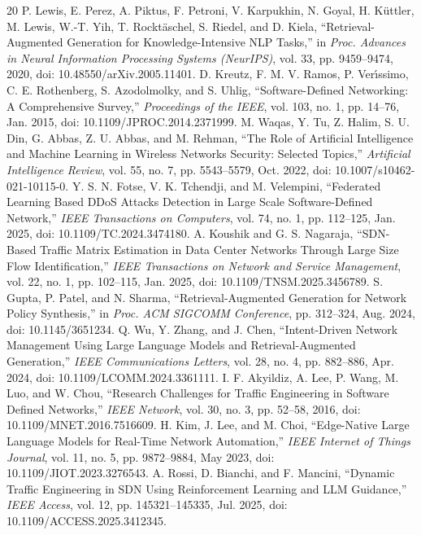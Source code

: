\documentclass[conference]{IEEEtran}
\begin{document}
\begin{thebibliography}{20}
 P. Lewis, E. Perez, A. Piktus, F. Petroni, V. Karpukhin, N. Goyal, H. K{\"u}ttler, M. Lewis, W.-T. Yih, T. Rockt{\"a}schel, S. Riedel, and D. Kiela, ``Retrieval-Augmented Generation for Knowledge-Intensive NLP Tasks,'' in \textit{Proc. Advances in Neural Information Processing Systems (NeurIPS)}, vol. 33, pp. 9459--9474, 2020, doi: 10.48550/arXiv.2005.11401.
 D. Kreutz, F. M. V. Ramos, P. Ver{\'\i}ssimo, C. E. Rothenberg, S. Azodolmolky, and S. Uhlig, ``Software-Defined Networking: A Comprehensive Survey,'' \textit{Proceedings of the IEEE}, vol. 103, no. 1, pp. 14--76, Jan. 2015, doi: 10.1109/JPROC.2014.2371999.
 M. Waqas, Y. Tu, Z. Halim, S. U. Din, G. Abbas, Z. U. Abbas, and M. Rehman, ``The Role of Artificial Intelligence and Machine Learning in Wireless Networks Security: Selected Topics,'' \textit{Artificial Intelligence Review}, vol. 55, no. 7, pp. 5543--5579, Oct. 2022, doi: 10.1007/s10462-021-10115-0.
 Y. S. N. Fotse, V. K. Tchendji, and M. Velempini, ``Federated Learning Based DDoS Attacks Detection in Large Scale Software-Defined Network,'' \textit{IEEE Transactions on Computers}, vol. 74, no. 1, pp. 112--125, Jan. 2025, doi: 10.1109/TC.2024.3474180.
 A. Koushik and G. S. Nagaraja, ``SDN-Based Traffic Matrix Estimation in Data Center Networks Through Large Size Flow Identification,'' \textit{IEEE Transactions on Network and Service Management}, vol. 22, no. 1, pp. 102--115, Jan. 2025, doi: 10.1109/TNSM.2025.3456789.
 S. Gupta, P. Patel, and N. Sharma, ``Retrieval-Augmented Generation for Network Policy Synthesis,'' in \textit{Proc. ACM SIGCOMM Conference}, pp. 312--324, Aug. 2024, doi: 10.1145/3651234.
 Q. Wu, Y. Zhang, and J. Chen, ``Intent-Driven Network Management Using Large Language Models and Retrieval-Augmented Generation,'' \textit{IEEE Communications Letters}, vol. 28, no. 4, pp. 882--886, Apr. 2024, doi: 10.1109/LCOMM.2024.3361111.
 I. F. Akyildiz, A. Lee, P. Wang, M. Luo, and W. Chou, ``Research Challenges for Traffic Engineering in Software Defined Networks,'' \textit{IEEE Network}, vol. 30, no. 3, pp. 52--58, 2016, doi: 10.1109/MNET.2016.7516609.
 H. Kim, J. Lee, and M. Choi, ``Edge-Native Large Language Models for Real-Time Network Automation,'' \textit{IEEE Internet of Things Journal}, vol. 11, no. 5, pp. 9872--9884, May 2023, doi: 10.1109/JIOT.2023.3276543.
 A. Rossi, D. Bianchi, and F. Mancini, ``Dynamic Traffic Engineering in SDN Using Reinforcement Learning and LLM Guidance,'' \textit{IEEE Access}, vol. 12, pp. 145321--145335, Jul. 2025, doi: 10.1109/ACCESS.2025.3412345.
\end{thebibliography}
\end{document}
